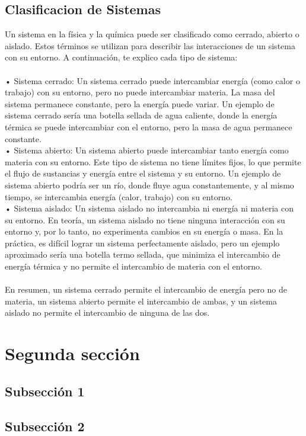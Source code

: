 \documentclass{article}
\begin{document}
\subsection{Clasificacion de Sistemas}
Un sistema en la física y la química puede ser clasificado como cerrado, abierto o aislado. Estos términos se utilizan para describir las interacciones de un sistema con su entorno. A continuación, te explico cada tipo de sistema:\\
\\
• Sistema cerrado: Un sistema cerrado puede intercambiar energía (como calor o trabajo) con su entorno, pero no puede intercambiar materia. La masa del sistema permanece constante, pero la energía puede variar. Un ejemplo de sistema cerrado sería una botella sellada de agua caliente, donde la energía térmica se puede intercambiar con el entorno, pero la masa de agua permanece constante.\\
• Sistema abierto: Un sistema abierto puede intercambiar tanto energía como materia con su entorno. Este tipo de sistema no tiene límites fijos, lo que permite el flujo de sustancias y energía entre el sistema y su entorno. Un ejemplo de sistema abierto podría ser un río, donde fluye agua constantemente, y al mismo tiempo, se intercambia energía (calor, trabajo) con su entorno.\\
• Sistema aislado: Un sistema aislado no intercambia ni energía ni materia con su entorno. En teoría, un sistema aislado no tiene ninguna interacción con su entorno y, por lo tanto, no experimenta cambios en su energía o masa. En la práctica, es difícil lograr un sistema perfectamente aislado, pero un ejemplo aproximado sería una botella termo sellada, que minimiza el intercambio de energía térmica y no permite el intercambio de materia con el entorno.\\
\\
En resumen, un sistema cerrado permite el intercambio de energía pero no de materia, un sistema abierto permite el intercambio de ambas, y un sistema aislado no permite el intercambio de ninguna de las dos.\\
\section{Segunda sección}
\lipsum[10-12]

\subsection{Subsección 1}
\lipsum[13-15]

\subsection{Subsección 2}
\lipsum[16-18]
\end{document}
